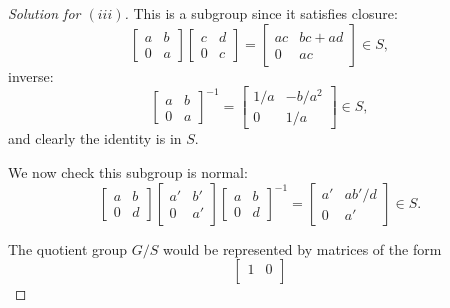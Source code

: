 \documentclass[12pt]{article}
\theoremstyle{remark}
\begin{document}
\begin{proof}[Solution for $(iii)$]
  This is a subgroup since it satisfies closure:
  \begin{equation*}
    \begin{bmatrix}
      a & b\\
      0 & a
    \end{bmatrix}
    \begin{bmatrix}
      c & d\\
      0 & c
    \end{bmatrix}
    =
    \begin{bmatrix}
      ac & bc+ad\\
      0 & ac
    \end{bmatrix} \in S,
  \end{equation*}
  inverse:
  \begin{equation*}
    \begin{bmatrix}
      a & b\\
      0 & a
    \end{bmatrix}^{-1}
    =
    \begin{bmatrix}
      1/a & -b/a^2\\
      0 & 1/a
    \end{bmatrix} \in S,
  \end{equation*}
  and clearly the identity is in $S$.
  \par We now check this subgroup is normal:
  \begin{equation*}
    \begin{bmatrix}
      a & b\\
      0 & d
    \end{bmatrix}
    \begin{bmatrix}
      a' & b'\\
      0 & a'
    \end{bmatrix}
    \begin{bmatrix}
      a & b\\
      0 & d
    \end{bmatrix}^{-1} = \begin{bmatrix}
      a' & ab'/d\\
      0 & a'
    \end{bmatrix} \in S.
  \end{equation*}
  \par The quotient group $G/S$ would be represented by matrices of the form
  \begin{equation*}
    \begin{bmatrix}
      1 & 0\\

\end{bmatrix}
\end{equation*}
\end{proof}
\end{document}
